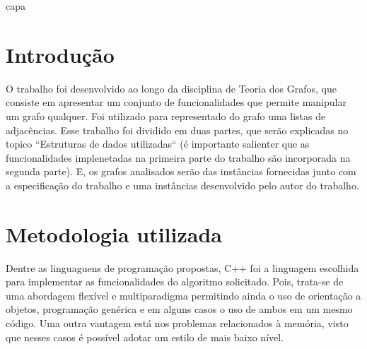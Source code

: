\documentclass[12pt, fleqn]{article}
\begin{document}
    \pagestyle {empty}

     {capa}    
    
    \pagestyle {empty}
    
    \newpage

    \pagestyle {plain}

    \setcounter{page}{0} 
    
    \setlength{\parindent}{0in}  
    
    \parskip 5pt  

    \section{Introdução}

      \par O trabalho foi desenvolvido ao longo da disciplina de Teoria dos Grafos, que consiste em apresentar um conjunto de funcionalidades que permite manipular um grafo qualquer. 
	    Foi utilizado para representado do grafo uma listas de adjacências. Esse trabalho foi dividido em duas partes, que serão explicadas no topico ``Estruturas de dados utilizadas`` 
	    (é importante salienter que as funcionalidades implenetadas na primeira parte do trabalho são incorporada na segunda parte).
	    E, os grafos analisados serão das instâncias fornecidas junto com a especificação do trabalho e uma instâncias desenvolvido pelo autor do trabalho. 


    \section{Metodologia utilizada}
      \par Dentre as linguaguens de programação propostas, C++ foi a linguagem escolhida para implementar as funcionalidades do algoritmo solicitado. 
	Pois, trata-se de uma abordagem flexível e multiparadigma permitindo ainda o uso de orientação a objetos, programação genérica e em alguns casos o uso de ambos em um mesmo código. 
	Uma outra vantagem está nos problemas relacionados à memória, visto que nesses casos é possível adotar um estilo de mais baixo nível.
\end{document}
